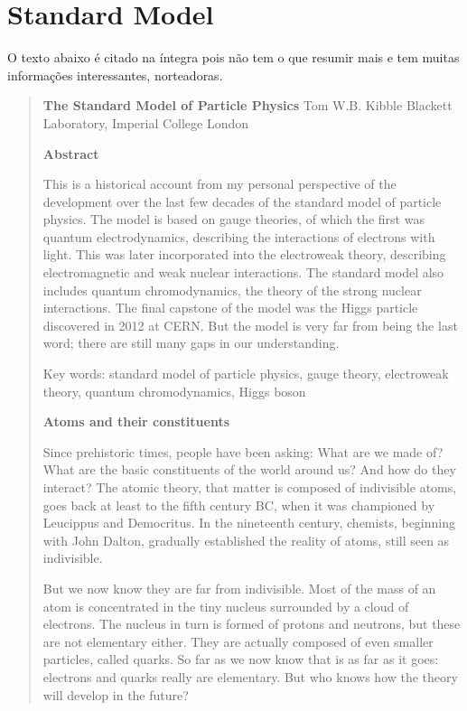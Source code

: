 \section{Standard Model}

O texto abaixo é citado na íntegra pois não tem o que resumir mais e tem muitas informações interessantes, norteadoras.
\begin{quote}
\begin{center}
\textbf{The Standard Model of Particle Physics}
Tom W.B. Kibble
Blackett Laboratory, Imperial College London
\end{center}

\textbf{Abstract}

This is a historical account from my personal perspective of the development over the last few decades of the standard model of particle physics. The model is based on gauge theories, of which the first was quantum electrodynamics, describing the interactions of electrons with light. This was later incorporated into the electroweak theory, describing electromagnetic and weak nuclear interactions. The standard model also includes quantum chromodynamics, the theory of the strong nuclear interactions. The final capstone of the model was the Higgs particle discovered in 2012 at CERN. But the model is very far from being the last word; there are still many gaps in our understanding.

Key words: standard model of particle physics, gauge theory, electroweak theory, quantum
chromodynamics, Higgs boson

\textbf{Atoms and their constituents}

Since prehistoric times, people have been asking: What are we made of? What are the basic constituents of the world around us? And how do they interact? The atomic theory, that matter is composed of indivisible atoms, goes back at least to the fifth century BC, when it was championed by Leucippus and Democritus. In the nineteenth century, chemists, beginning with John Dalton, gradually established the reality of atoms, still seen as indivisible.

But we now know they are far from indivisible. Most of the mass of an atom is concentrated in the tiny nucleus surrounded by a cloud of electrons. The nucleus in turn is formed of protons and neutrons, but these are not elementary either. They are actually composed of even smaller particles, called quarks. So far as we now know that is as far as it goes: electrons and quarks really are elementary. But who knows how the theory will develop in the future?


\end{quote}
